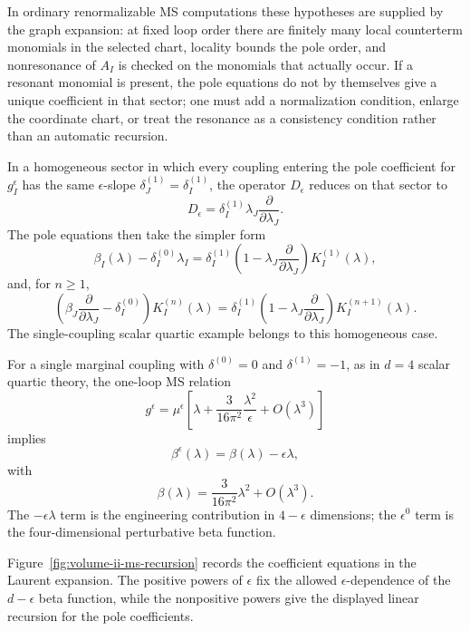 In ordinary renormalizable MS computations these hypotheses are supplied by
the graph expansion: at fixed loop order there are finitely many local
counterterm monomials in the selected chart, locality bounds the pole order,
and nonresonance of \(A_I\) is checked on the monomials that actually occur.
If a resonant monomial is present, the pole equations do not by themselves
give a unique coefficient in that sector; one must add a normalization
condition, enlarge the coordinate chart, or treat the resonance as a
consistency condition rather than an automatic recursion.

In a homogeneous sector in which every coupling entering the pole coefficient
for \(g_I^\epsilon\) has the same \(\epsilon\)-slope
\(\delta_J^{(1)}=\delta_I^{(1)}\), the operator \(D_\epsilon\) reduces on that
sector to
\[
  D_\epsilon
  =
  \delta_I^{(1)}
  \lambda_J\frac{\partial}{\partial\lambda_J}.
\]
The pole equations then take the simpler form
\[
  \beta_I(\lambda)-\delta_I^{(0)}\lambda_I
  =
  \delta_I^{(1)}
  \left(
    1-\lambda_J\frac{\partial}{\partial\lambda_J}
  \right)K_I^{(1)}(\lambda),
\]
and, for \(n\ge1\),
\[
  \left(
    \beta_J\frac{\partial}{\partial\lambda_J}
    -\delta_I^{(0)}
  \right)K_I^{(n)}(\lambda)
  =
  \delta_I^{(1)}
  \left(
    1-\lambda_J\frac{\partial}{\partial\lambda_J}
  \right)K_I^{(n+1)}(\lambda).
\]
The single-coupling scalar quartic example belongs to this homogeneous case.

For a single marginal coupling with
\(\delta^{(0)}=0\) and \(\delta^{(1)}=-1\), as in \(d=4\) scalar quartic
theory, the one-loop MS relation
\[
  g^\epsilon
  =
  \mu^\epsilon
  \left[
    \lambda+\frac{3}{16\pi^2}\frac{\lambda^2}{\epsilon}
    +O(\lambda^3)
  \right]
\]
implies
\[
  \beta^\epsilon(\lambda)
  =
  \beta(\lambda)-\epsilon\lambda,
\]
with
\[
  \beta(\lambda)
  =
  \frac{3}{16\pi^2}\lambda^2+O(\lambda^3).
\]
The \(-\epsilon\lambda\) term is the engineering contribution in
\(4-\epsilon\) dimensions; the \(\epsilon^0\) term is the four-dimensional
perturbative beta function.

Figure~\ref{fig:volume-ii-ms-recursion} records the coefficient equations in
the Laurent expansion.  The positive powers of \(\epsilon\) fix the allowed
\(\epsilon\)-dependence of the \(d-\epsilon\) beta function, while the
nonpositive powers give the displayed linear recursion for the pole
coefficients.

